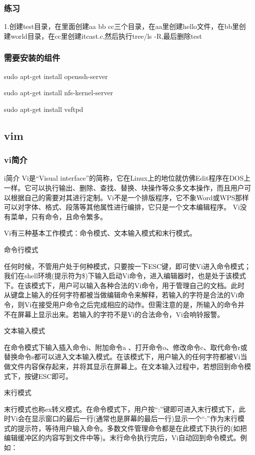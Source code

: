\documentclass[11pt]{article}
\begin{document}
\subsubsection{练习}
\label{sec-1-1-14}
1.创建test目录，在里面创建aa  bb  cc三个目录，在aa里创建hello文件，在bb里创建world目录，在cc里创建itcast.c,然后执行tree/ls -R,最后删除test
\subsubsection{需要安装的组件}
\label{sec-1-1-15}

sudo apt-get install openssh-server

sudo apt-get install nfs-kernel-server

sudo apt-get install vsftpd

\subsection{vim}
\label{sec-1-2}
\subsubsection{vi简介}
\label{sec-1-2-1}
i简介
Vi是“Visual interface”的简称，它在Linux上的地位就仿佛Edit程序在DOS上一样。它可以执行输出、删除、查找、替换、块操作等众多文本操作，而且用户可以根据自己的需要对其进行定制。Vi不是一个排版程序，它不象Word或WPS那样可以对字体、格式、段落等其他属性进行编排，它只是一个文本编辑程序。 Vi没有菜单，只有命令，且命令繁多。

Vi有三种基本工作模式：命令模式、文本输入模式和末行模式。 

命令行模式 

任何时候，不管用户处于何种模式，只要按一下ESC键，即可使Vi进入命令模式；我们在shell环境(提示符为\$)下输入启动Vi命令，进入编辑器时，也是处于该模式下。在该模式下，用户可以输入各种合法的Vi命令，用于管理自己的文档。此时从键盘上输入的任何字符都被当做编辑命令来解释，若输入的字符是合法的Vi命令，则Vi在接受用户命令之后完成相应的动作。但需注意的是，所输入的命令并不在屏幕上显示出来。若输入的字符不是Vi的合法命令，Vi会响铃报警。 

文本输入模式 

在命令模式下输入插入命令i、附加命令a 、打开命令o、修改命令c、取代命令r或替换命令s都可以进入文本输入模式。在该模式下，用户输入的任何字符都被Vi当做文件内容保存起来，并将其显示在屏幕上。在文本输入过程中，若想回到命令模式下，按键ESC即可。 

末行模式 

末行模式也称ex转义模式。在命令模式下，用户按“:”键即可进入末行模式下，此时Vi会在显示窗口的最后一行(通常也是屏幕的最后一行)显示一个“:”作为末行模式的提示符，等待用户输入命令。多数文件管理命令都是在此模式下执行的(如把编辑缓冲区的内容写到文件中等)。末行命令执行完后，Vi自动回到命令模式。例如： 
\end{document}
